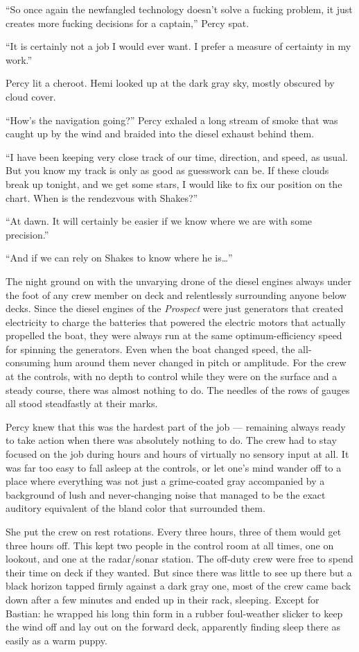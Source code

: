 \documentclass[
]{scrbook}
\begin{document}
``So once again the newfangled technology doesn't solve a fucking
problem, it just creates more fucking decisions for a captain,'' Percy
spat.

``It is certainly not a job I would ever want. I prefer a measure of
certainty in my work.''

Percy lit a cheroot. Hemi looked up at the dark gray sky, mostly
obscured by cloud cover.

``How's the navigation going?'' Percy exhaled a long stream of smoke
that was caught up by the wind and braided into the diesel exhaust
behind them.

``I have been keeping very close track of our time, direction, and
speed, as usual. But you know my track is only as good as guesswork can
be. If these clouds break up tonight, and we get some stars, I would
like to fix our position on the chart. When is the rendezvous with
Shakes?''

``At dawn. It will certainly be easier if we know where we are with some
precision.''

``And if we can rely on Shakes to know where he is\ldots{}''

The night ground on with the unvarying drone of the diesel engines
always under the foot of any crew member on deck and relentlessly
surrounding anyone below decks. Since the diesel engines of the
\emph{Prospect} were just generators that created electricity to charge
the batteries that powered the electric motors that actually propelled
the boat, they were always run at the same optimum-efficiency speed for
spinning the generators. Even when the boat changed speed, the
all-consuming hum around them never changed in pitch or amplitude. For
the crew at the controls, with no depth to control while they were on
the surface and a steady course, there was almost nothing to do. The
needles of the rows of gauges all stood steadfastly at their marks.

Percy knew that this was the hardest part of the job --- remaining
always ready to take action when there was absolutely nothing to do. The
crew had to stay focused on the job during hours and hours of virtually
no sensory input at all. It was far too easy to fall asleep at the
controls, or let one's mind wander off to a place where everything was
not just a grime-coated gray accompanied by a background of lush and
never-changing noise that managed to be the exact auditory equivalent of
the bland color that surrounded them.

She put the crew on rest rotations. Every three hours, three of them
would get three hours off. This kept two people in the control room at
all times, one on lookout, and one at the radar/sonar station. The
off-duty crew were free to spend their time on deck if they wanted. But
since there was little to see up there but a black horizon tapped firmly
against a dark gray one, most of the crew came back down after a few
minutes and ended up in their rack, sleeping. Except for Bastian: he
wrapped his long thin form in a rubber foul-weather slicker to keep the
wind off and lay out on the forward deck, apparently finding sleep there
as easily as a warm puppy.
\end{document}

